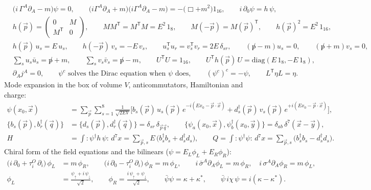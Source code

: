 \documentclass[10pt,a4paper]{article}
\begin{document}
\begin{align*}
&\big(i\,\Gamma^A\partial_A-m\big)\psi=0,\qquad \big(i\Gamma^A\partial_A+m\big)\big(i\Gamma^A\partial_A-m\big)=-\big(\Box+m^2\big)1_{16},\qquad i\,\partial_0\psi=h\,\psi, \\
&h(\vec p)=\begin{pmatrix}0&M\\M^{\mathsf T}&0\end{pmatrix},\qquad MM^{\mathsf T}=M^{\mathsf T}M=E^2\,1_8,\qquad M(-\vec p)=M(\vec p)^{\mathsf T},\qquad h(\vec p)^2=E^2\,1_{16}, \\
&h(\vec p)\,u_s=E\,u_s,\qquad h(-\vec p)\,v_s=-E\,v_s,\qquad u_s^{\mathsf T}u_r=v_s^{\mathsf T}v_r=2E\,\delta_{sr},\qquad (\not p-m)u_s=0,\qquad (\not p+m)v_s=0, \\
&\textstyle\sum_su_s\bar u_s=\not p+m,\qquad \sum_sv_s\bar v_s=\not p-m,\qquad U^{\mathsf T}U=1_{16},\qquad U^{\mathsf T}h(\vec p)\,U=\mathrm{diag}(E\,1_8,-E\,1_8), \\
&\partial_Aj^A=0,\qquad \psi^{c}\text{ solves the Dirac equation when }\psi\text{ does},\qquad (\psi^c)^c=-\psi,\qquad L^{\mathsf T}\eta L=\eta .
\end{align*}
Mode expansion in the box of volume $V$, anticommutators, Hamiltonian and charge:
\begin{align*}
\psi(x_0,\vec x)&=\sum_{\vec p}\sum_{s=1}^{8}\frac{1}{\sqrt{2EV}}\Big[b_s(\vec p)\,u_s(\vec p)\,e^{-i(Ex_0-\vec p\cdot\vec x)}+d_s^\dagger(\vec p)\,v_s(\vec p)\,e^{+i(Ex_0-\vec p\cdot\vec x)}\Big], \\
\big\lbrace b_s(\vec p),b_r^\dagger(\vec q)\big\rbrace&=\big\lbrace d_s(\vec p),d_r^\dagger(\vec q)\big\rbrace=\delta_{sr}\,\delta_{\vec p\vec q},\qquad \big\lbrace\psi_a(x_0,\vec x),\psi_b^\dagger(x_0,\vec y)\big\rbrace=\delta_{ab}\,\delta^7(\vec x-\vec y), \\
H&=\int:\psi^\dagger h\,\psi:\,d^7x=\sum_{\vec p,s}E\,\big(b_s^\dagger b_s+d_s^\dagger d_s\big),\qquad Q=\int:\psi^\dagger\psi:\,d^7x=\sum_{\vec p,s}\big(b_s^\dagger b_s-d_s^\dagger d_s\big).
\end{align*}
Chiral form of the field equations and the bilinears ($\psi=E_L\phi_L+E_R\phi_R$):
\begin{align*}
\big(i\,\partial_0+\tau^{O}_i\,\partial_i\big)\,\phi_L&=m\,\phi_R,\qquad \big(i\,\partial_0-\tau^{O}_i\,\partial_i\big)\,\phi_R=m\,\phi_L,\qquad i\,\bar\sigma^A\partial_A\phi_L=m\,\phi_R,\quad i\,\sigma^A\partial_A\phi_R=m\,\phi_L, \\
\phi_L&=\frac{\psi_\uparrow+i\,\psi_\downarrow}{\sqrt2},\qquad \phi_R=\frac{i\,\psi_\uparrow+\psi_\downarrow}{\sqrt2},\qquad \bar\psi\psi=\kappa+\kappa^*,\qquad \bar\psi\,i\chi\,\psi=i(\kappa-\kappa^*) .
\end{align*}
\end{document}
